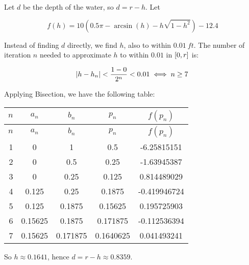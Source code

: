 \documentclass[../../Assignments.tex]{subfiles}
\begin{document}
\begin{solution}
    Let \(d\) be the depth of the water, so \(d = r - h\). Let

    \[f(h) = 10 (\num{0.5} \pi - \arcsin(h) - h \sqrt{1 - h^2}) - \num{12.4}\]

    Instead of finding \(d\) directly, we find \(h\), also to within
    \(\SI{0.01}{ft}\). The number of iteration \(n\) needed to approximate \(h\)
    to within \(\num{0.01}\) in \(\interval{0}{r}\) is:

    \[\abs{h - h_n} < \frac{1 - 0}{2^n} < 0.01 \iff n \geq 7\]

    Applying Bisection, we have the following table:

    \begin{longtable}{r S[table-format=1.5] S[table-format=1.6] S[table-format=1.7] S[table-format=-1.9]}
        \toprule
        \(n\)  &   {\(a_n\)}   &   {\(b_n\)}   &   {\(p_n\)}   &  {\(f(p_n)\)}  \\
        \midrule
        \endfirsthead
        \toprule
        \(n\)  &   {\(a_n\)}   &   {\(b_n\)}   &   {\(p_n\)}   &  {\(f(p_n)\)}  \\
        \midrule
          &  0            &  1            &  0.5          &  -6.25815151   \\
            2  &  0            &  0.5          &  0.25         &  -1.63945387   \\
            3  &  0            &  0.25         &  0.125        &   0.814489029  \\
            4  &  0.125        &  0.25         &  0.1875       &  -0.419946724  \\
            5  &  0.125        &  0.1875       &  0.15625      &   0.195725903  \\
            6  &  0.15625      &  0.1875       &  0.171875     &  -0.112536394  \\
            7  &  0.15625      &  0.171875     &  0.1640625    &   0.041493241  \\
        \bottomrule
    \end{longtable}

    So \(h \approx \num{0.1641}\), hence \(d = r - h \approx \num{0.8359}\).
\end{solution}
\end{document}
